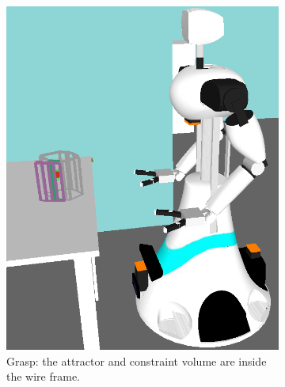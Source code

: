 \begin{figure}[ht]
\begin{subfigure}[t]{0.3\linewidth}
		\includegraphics[width = 1\linewidth]{pics/TopologicalGrasp_emphsphere}
		\caption{Grasp: the attractor and constraint volume are inside the wire frame.}
		\label{wbp:fig:topgrasp}
	\end{subfigure}
	\hfill
	\begin{subfigure}[t]{0.3\linewidth}
		\centering

\end{subfigure}
\end{figure}
